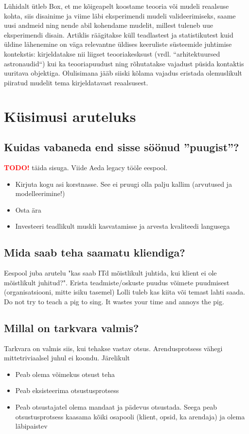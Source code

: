 \documentclass{tufte-book}
\newcommand{\TODO}{\textcolor{red}{\bf TODO!}\xspace}
\begin{document}
Lühidalt ütleb Box, et me kõigeapelt koostame teooria või mudeli reaalsuse kohta, siis disainime ja viime läbi eksperimendi mudeli valideerimiseks, saame uusi andmeid ning nende abil kohendame mudelit, millest tuleneb uue eksperimendi disain. Artiklis räägitakse küll teadlastest ja statistikutest kuid üldine lähenemine on  väga relevantne üldises keeruliste süsteemide juhtimise kontekstis: kirjeldatakse nii liigset teooriakesksust (vrdl. ``arhitektuursed astronaudid``) kui ka teooriapuudust ning rõhutatakse vajadust püsida kontaktis uuritava objektiga. Olulisimana jääb siiski kõlama vajadus eristada olemuslikult piiratud mudelit tema kirjeldatavast reaalsusest.  

\section{Küsimusi aruteluks}
\subsection{Kuidas vabaneda end sisse söönud ”puugist”?}
\TODO täida sisuga. Viide Aeda legacy tööle eespool. 

\begin{itemize}
	\item Kirjuta kogu asi korstnasse. See ei pruugi olla palju kallim (arvutused ja modelleerimine!)
	\item Osta ära
	\item Investeeri teadlikult muskli kasvatamisse ja arvesta kvaliteedi langusega
\end{itemize}

\subsection{Mida saab teha saamatu kliendiga?}
Eespool juba arutelu "kas saab ITd mõistlikult juhtida, kui klient ei ole mõistlikult juhitud?". Erista teadmiste/oskuste puudus võimete puudmisest (organisatsiooni, mitte isiku tasemel) Lolli tuleb kas kiita või temast lahti saada. Do not try to teach a pig to sing. It wastes your time and annoys the pig. 

\subsection{Millal on tarkvara valmis?}
Tarkvara on valmis siis, kui tehakse vastav otsus. Arendusprotsess vähegi mittetriviaalsel juhul ei koondu. Järelikult
\begin{itemize}
	\item Peab olema võimekus otsust teha
	\item Peab eksisteerima otsustusprotsess
	\item Peab otsustajatel olema mandaat ja pädevus otsustada. Seega peab otsustusprotsess kaasama kõiki osapooli (klient, opsid, ka arendaja) ja olema läbipaistev
\end{itemize}
\end{document}
